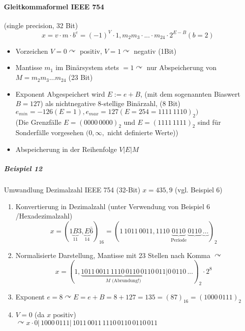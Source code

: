 \documentclass[a4paper]{scrartcl}
\begin{document}
\paragraph{Gleitkommaformel IEEE 754} (single precision, 32 Bit)
\[x=v\cdot m \cdot b^e = (-1)^V \cdot 1, m_2m_3 \cdot ... \cdot m_{24} \cdot 2^{E-B} (b=2)\]
\begin{itemize}
\item Vorzeichen $V=0 \curvearrowright$ positiv, $V=1 \curvearrowright$ negativ (1Bit)
\item Mantisse $m_1$ im Binärsystem stets $=1 \curvearrowright$ nur Abspeicherung von $M=m_2m_3 \dots m_{24}$ (23 Bit)
\item Exponent Abgespeichert wird $E:= e+B$, (mit dem sogenannten Biaswert $B=127$) als nichtnegative 8-stellige Binärzahl, (8 Bit)\\
$e_{min} = -126 (E=1), e_{max} = 127 (E=254=1111 \, 1110)_2)$\\
(Die Grenzfälle $E=(0000 \, 0000)_2$ und $E=(1111 \, 1111)_2$ sind für Sonderfälle vorgesehen $(0,\infty ,$ nicht definierte Werte))
\item Abspeicherung in der Reihenfolge $V| E |M$

\end{itemize}

\subparagraph{Beispiel 12} Umwandlung Dezimalzahl IEEE 754 (32-Bit) $x=435,9$ (vgl. Beispiel 6)

\begin{enumerate}
\item Konvertierung in Dezimalzahl (unter Verwendung von Beispiel 6 /Hexadezimalzahl)\\
\[x=(1 \underbrace{B}_{11} 3, \underbrace{E}_{14} \bar{6})_{16} = (1 \, 1011 \, 0011, 1110 \, \underbrace{0110}_{\text{Periode}} \, \underbrace{0110} \, \underbrace{...})_2\]

\item Normalisierte Darstellung, Mantisse mit 23 Stellen nach Komma $\curvearrowright$
\[x=(1, \underbrace{ 1011 \, 0011 \, 1110 \, 0110 \, 0110 \, 011}_{M \text{ (Abrundung!)}}|0 \, 0110 \, ...)_2 \cdot 2^8\]
\item Exponent $e=8 \curvearrowright E=e+B=8+127=135=(87)_{16} = (1000 \, 0111)_2$
\item $V=0$ (da $x$ positiv)\\
$\curvearrowright x \cdot 0| \, 1000 \, 0111 |\, 1011 \, 0011 \, 1110 \, 0110 \, 0110 \, 011$ %
\end{enumerate}
\end{document}

